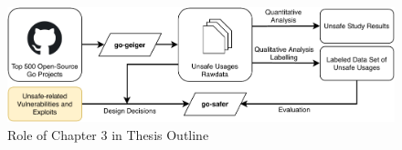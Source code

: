 \begin{figure}[ht]
    \includegraphics[width=\textwidth]{assets/figures/chapter3/outline3.pdf}
    \caption{Role of Chapter 3 in Thesis Outline}
    \label{fig:outline3}
\end{figure}
